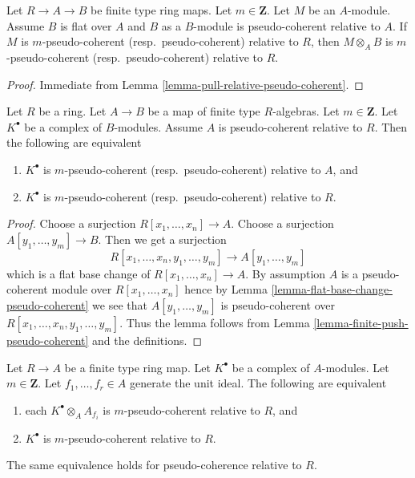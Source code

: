 \begin{lemma}
\label{lemma-pull-relative-pseudo-coherent-module}
Let $R \to A \to B$ be finite type ring maps.
Let $m \in \mathbf{Z}$. Let $M$ be an $A$-module.
Assume $B$ is flat over $A$ and $B$ as a $B$-module is
pseudo-coherent relative to $A$.
If $M$ is $m$-pseudo-coherent (resp.\ pseudo-coherent)
relative to $R$, then $M \otimes_A B$ is
$m$-pseudo-coherent (resp.\ pseudo-coherent) relative to $R$.
\end{lemma}

\begin{proof}
Immediate from
Lemma \ref{lemma-pull-relative-pseudo-coherent}.
\end{proof}

\begin{lemma}
\label{lemma-composition-relative-pseudo-coherent}
Let $R$ be a ring. Let $A \to B$ be a map of finite type $R$-algebras.
Let $m \in \mathbf{Z}$. Let $K^\bullet$ be a complex of $B$-modules.
Assume $A$ is pseudo-coherent relative to $R$. Then the following are
equivalent
\begin{enumerate}
\item $K^\bullet$ is $m$-pseudo-coherent (resp.\ pseudo-coherent)
relative to $A$, and
\item $K^\bullet$ is $m$-pseudo-coherent (resp.\ pseudo-coherent)
relative to $R$.
\end{enumerate}
\end{lemma}

\begin{proof}
Choose a surjection $R[x_1, \ldots, x_n] \to A$.
Choose a surjection $A[y_1, \ldots, y_m] \to B$.
Then we get a surjection
$$
R[x_1, \ldots, x_n, y_1, \ldots, y_m] \to A[y_1, \ldots, y_m]
$$
which is a flat base change of $R[x_1, \ldots, x_n] \to A$.
By assumption $A$ is a pseudo-coherent module over $R[x_1, \ldots, x_n]$
hence by
Lemma \ref{lemma-flat-base-change-pseudo-coherent}
we see that $A[y_1, \ldots, y_m]$ is pseudo-coherent over
$R[x_1, \ldots, x_n, y_1, \ldots, y_m]$. Thus the lemma follows from
Lemma \ref{lemma-finite-push-pseudo-coherent}
and the definitions.
\end{proof}

\begin{lemma}
\label{lemma-glue-relative-pseudo-coherent}
Let $R \to A$ be a finite type ring map.
Let $K^\bullet$ be a complex of $A$-modules.
Let $m \in \mathbf{Z}$.
Let $f_1, \ldots, f_r \in A$ generate the unit ideal.
The following are equivalent
\begin{enumerate}
\item each $K^\bullet \otimes_A A_{f_i}$ is
$m$-pseudo-coherent relative to $R$, and
\item $K^\bullet$ is $m$-pseudo-coherent relative to $R$.
\end{enumerate}
The same equivalence holds for pseudo-coherence relative to $R$.
\end{lemma}

